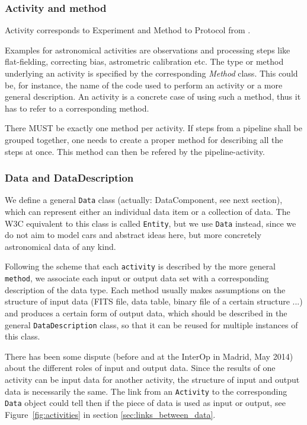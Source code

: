 \documentclass[11pt,a4paper]{ivoa}
\begin{document}
\subsubsection{Activity and method}
Activity corresponds to Experiment and Method to Protocol from \cite{std:SimDM}.

Examples for astronomical activities are observations and processing steps like
flat-fielding, correcting bias, astrometric calibration etc. The type or method
underlying an activity is specified by the corresponding \emph{Method} class.
This could be, for instance, the name of the code used to perform an activity or a more general description. An activity is a concrete case of using such a method, thus it has to refer to a corresponding method. 


There MUST be exactly one method per activity. If steps from a pipeline shall be 
grouped together, one needs to create a proper method for describing all 
the steps at once. This method can then be refered by the pipeline-activity. 

\subsubsection{Data and DataDescription}
We define a general \texttt{Data} class (actually: DataComponent, see next section), 
which can represent either an individual data item or a collection of data. The W3C equivalent to this class is called \texttt{Entity}, but we use \texttt{Data} instead, since we do not aim to model cars and abstract ideas here, but more concretely astronomical data of any kind. 

Following the scheme that each \texttt{activity} is described
by the more general \texttt{method}, we associate each input or
output data set with a corresponding description of the data type. Each method
usually makes assumptions on the structure of input data (FITS file, data
table, binary file of a certain structure ...) and produces a certain form of
output data, which should be described in the general \texttt{DataDescription}
class, so that it can be reused for multiple instances of this class.


There has been some dispute (before and at the InterOp in Madrid, May 2014) about the different roles of input and output data. Since the results of one activity can be input data for
another activity, the structure of input and output data is necessarily the same.
The link from an \texttt{Activity} to the corresponding \texttt{Data}
object could tell then if the piece of data is used as input or output, see Figure~\ref{fig:activities} in section \ref{sec:links_between_data}.
\end{document}
